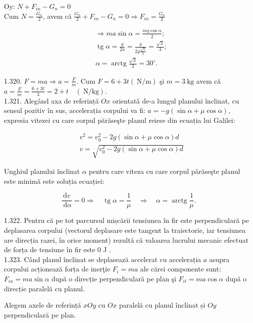 Oy: $N+F_{i n}-G_{n}=0$\\
Cum $N=\frac{G_{n}}{2}$, avem că $\frac{G_{n}}{2}+F_{i n}-G_{n}=0 \Rightarrow F_{i n}=\frac{G_{n}}{2}$

$$
\begin{aligned}
& \Rightarrow m a \sin \alpha=\frac{m g \cos \alpha}{2} ; \\
& \operatorname{tg} \alpha=\frac{g}{2 a}=\frac{g}{2 g \frac{\sqrt{3}}{2}}=\frac{\sqrt{3}}{3} ; \\
& \alpha=\operatorname{arctg} \frac{\sqrt{3}}{3}=30^{\circ} .
\end{aligned}
$$

1.320. $F=m a \Rightarrow a=\frac{F}{m}$. Cum $F=6+3 t(\mathrm{~N} / \mathrm{m})$ şi $m=3 \mathrm{~kg}$ avem că $a=\frac{F}{m}=\frac{6+3 t}{3}=2+t \quad(\mathrm{~N} / \mathrm{kg})$.\\
1.321. Alegând axa de referință $O x$ orientatǎ de-a lungul planului înclinat, cu sensul pozitiv în sus, accelerația corpului va fi: $a=-g(\sin \alpha+\mu \cos \alpha)$, expresia vitezei cu care corpul părăseşte planul reiese din ecuația lui Galilei:

$$
\begin{aligned}
& v^{2}=v_{0}^{2}-2 g(\sin \alpha+\mu \cos \alpha) d \\
& v=\sqrt{v_{0}^{2}-2 g(\sin \alpha+\mu \cos \alpha) d}
\end{aligned}
$$

Unghiul planului înclinat $\alpha$ pentru care viteza cu care corpul pǎrăseşte planul este minimă este soluția ecuației:

$$
\frac{\mathrm{d} v}{\mathrm{~d} \alpha}=0 \Rightarrow \quad \operatorname{tg} \alpha=\frac{1}{\mu} \quad \Rightarrow \quad \alpha=\operatorname{arctg} \frac{1}{\mu} .
$$

1.322. Pentru că pe tot parcursul mișcării tensiunea în fir este perpendiculară pe deplasarea corpului (vectorul deplasare este tangent la traiectorie, iar tensiunea are direcția razei, în orice moment) rezultă că valoarea lucrului mecanic efectuat de forța de tensiune în fir este 0 J .\\
1.323. Când planul înclinat se deplasează accelerat cu accelerația $a$ asupra corpului acționează forța de inerţie $F_{i}=m a$ ale cărei componente sunt: $F_{i n}=m a \sin \alpha$ după o direcție perpendiculară pe plan şi $F_{i t}=m a \cos \alpha$ dupã o direcție paralelă cu planul.

Alegem axele de referință $x O y$ cu $O x$ paralelă cu planul înclinat și $O y$ perpendiculară pe plan.


